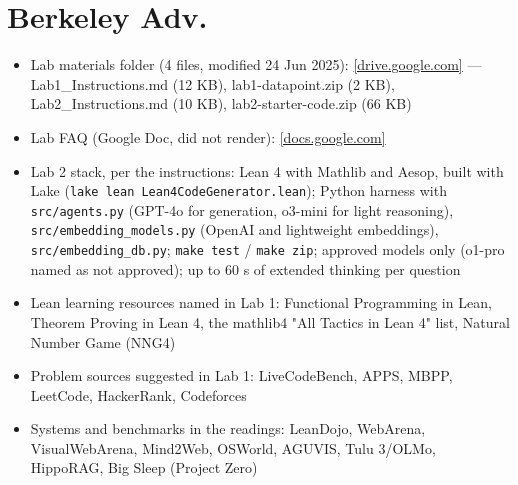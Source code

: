 \documentclass[10pt,oneside]{report}
\begin{document}
\section{Berkeley Adv.}
{\small\begin{itemize}
\item Lab materials folder (4 files, modified 24 Jun 2025): \href{https://drive.google.com/drive/folders/1DsXvOqfvFs4yBc2ZrLuOCXAFXBb5q1kg}{[drive.google.com]} --- Lab1\_\allowbreak{}Instructions.md (12 KB), lab1-datapoint.zip (2 KB), Lab2\_\allowbreak{}Instructions.md (10 KB), lab2-starter-code.zip (66 KB)
\item Lab FAQ (Google Doc, did not render): \href{https://docs.google.com/document/d/1AmVd4tU8wvYlINDmUuEuw6TIvxl95yjgui9JZAZ8P80/edit}{[docs.google.com]}
\item Lab 2 stack, per the instructions: Lean 4 with Mathlib and Aesop, built with Lake (\texttt{lake lean Lean4CodeGenerator.\allowbreak{}lean}); Python harness with \texttt{src/\allowbreak{}agents.\allowbreak{}py} (GPT-4o for generation, o3-mini for light reasoning), \texttt{src/\allowbreak{}embedding\_\allowbreak{}models.\allowbreak{}py} (OpenAI and lightweight embeddings), \texttt{src/\allowbreak{}embedding\_\allowbreak{}db.\allowbreak{}py}; \texttt{make test} / \texttt{make zip}; approved models only (o1-pro named as not approved); up to 60 s of extended thinking per question
\item Lean learning resources named in Lab 1: Functional Programming in Lean, Theorem Proving in Lean 4, the mathlib4 "All Tactics in Lean 4" list, Natural Number Game (NNG4)
\item Problem sources suggested in Lab 1: LiveCodeBench, APPS, MBPP, LeetCode, HackerRank, Codeforces
\item Systems and benchmarks in the readings: LeanDojo, WebArena, VisualWebArena, Mind2Web, OSWorld, AGUVIS, Tulu 3/OLMo, HippoRAG, Big Sleep (Project Zero)
\end{itemize}}
\end{document}
